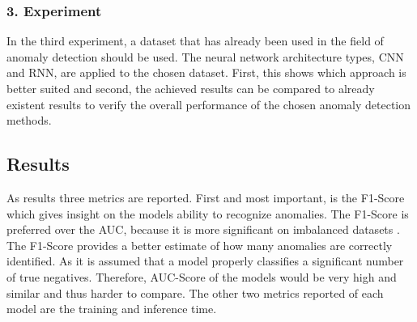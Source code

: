 \subsubsection{3. Experiment}
In the third experiment, a dataset that has already been used in the field of anomaly detection should be used. The neural network architecture types, CNN and RNN, are applied to the chosen dataset. First, this shows which approach is better suited and second, the achieved results can be compared to already existent results to verify the overall performance of the chosen anomaly detection methods.

\subsection{Results}
As results three metrics are reported. First and most important, is the F1-Score which gives insight on the models ability to recognize anomalies. The F1-Score is preferred over the AUC, because it is more significant on imbalanced datasets \parencite{Forman2010}. The F1-Score provides a better estimate of how many anomalies are correctly identified. As it is assumed that a model properly classifies a significant number of true negatives. Therefore, AUC-Score of the models would be very high and similar and thus harder to compare. The other two metrics reported of each model are the training and inference time.



 